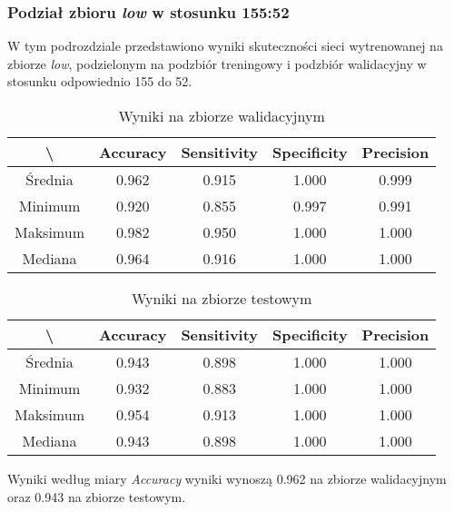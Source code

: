 \subsubsection{Podział zbioru \textit{low} w stosunku 155:52}

W tym podrozdziale przedstawiono wyniki skuteczności sieci wytrenowanej na zbiorze \textit{low}, podzielonym na podzbiór treningowy i podzbiór walidacyjny w stosunku odpowiednio 155 do 52.

\begin{table}[H]
	\centering
	\caption{Wyniki na zbiorze walidacyjnym}
	\vspace{6pt}
	{\footnotesize
		\begin{tabular}{|c|c|c|c|c|}
      \hline \textbackslash & Accuracy & Sensitivity & Specificity & Precision \\
      \hline Średnia & 0.962 & 0.915 & 1.000 & 0.999 \\
      \hline Minimum & 0.920 & 0.855 & 0.997 & 0.991 \\
      \hline Maksimum & 0.982 & 0.950 & 1.000 & 1.000 \\
      \hline Mediana & 0.964 & 0.916 & 1.000 & 1.000 \\
      \hline
		\end{tabular}
	}
	\vspace{0pt}
\end{table}

\begin{table}[H]
	\centering
	\caption{Wyniki na zbiorze testowym}
	\vspace{6pt}
	{\footnotesize
		\begin{tabular}{|c|c|c|c|c|}
      \hline \textbackslash & Accuracy & Sensitivity & Specificity & Precision \\
      \hline Średnia & 0.943 & 0.898 & 1.000 & 1.000 \\
      \hline Minimum & 0.932 & 0.883 & 1.000 & 1.000 \\
      \hline Maksimum & 0.954 & 0.913 & 1.000 & 1.000 \\
      \hline Mediana & 0.943 & 0.898 & 1.000 & 1.000 \\
      \hline
		\end{tabular}
	}
	\vspace{0pt}
\end{table}

Wyniki według miary \textit{Accuracy} wyniki wynoszą 0.962 na zbiorze walidacyjnym oraz 0.943 na zbiorze testowym.
